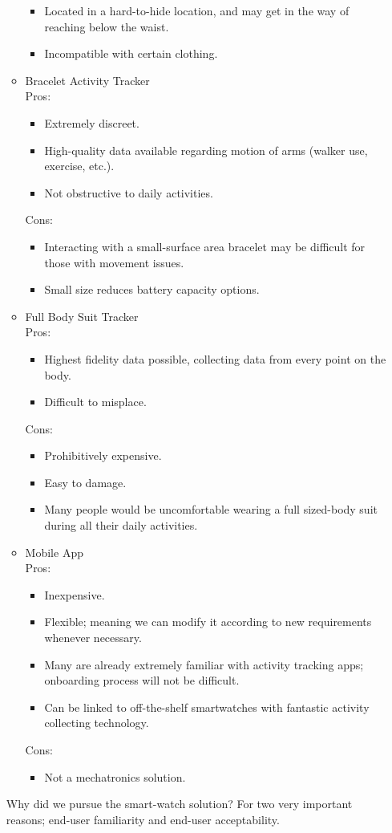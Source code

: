\documentclass[12pt, titlepage]{article}
\begin{document}
\begin{enumerate}
\begin{itemize}
\begin{itemize}
		\item Located in a hard-to-hide location, and may get in the way of reaching below the waist.
		\item Incompatible with certain clothing.
	\end{itemize}
\item Bracelet Activity Tracker\\
	Pros:
	\begin{itemize}
		\item Extremely discreet.
		\item High-quality data available regarding motion of arms (walker use, exercise, etc.).
		\item Not obstructive to daily activities.
	\end{itemize}
	Cons:
	\begin{itemize}
		\item Interacting with a small-surface area bracelet may be difficult for those with movement issues.
		\item Small size reduces battery capacity options.
	\end{itemize}
\item Full Body Suit Tracker\\
	Pros:
	\begin{itemize}
		\item Highest fidelity data possible, collecting data from every point on the body.
		\item Difficult to misplace.
	\end{itemize}
	Cons:
	\begin{itemize}
		\item Prohibitively expensive.
		\item Easy to damage.
		\item Many people would be uncomfortable wearing a full sized-body suit during all their daily activities.
	\end{itemize}
\item Mobile App \\
	Pros:
	\begin{itemize}
		\item Inexpensive.
		\item Flexible; meaning we can modify it according to new requirements whenever necessary.
		\item Many are already extremely familiar with activity tracking apps; onboarding process will not be difficult.
		\item Can be linked to off-the-shelf smartwatches with fantastic activity collecting technology.
	\end{itemize}
	Cons:
	\begin{itemize}
		\item Not a mechatronics solution.
	\end{itemize}
\end{itemize}
Why did we pursue the smart-watch solution? For two very important reasons; end-user familiarity and end-user acceptability.\\


\end{enumerate}
\end{document}
